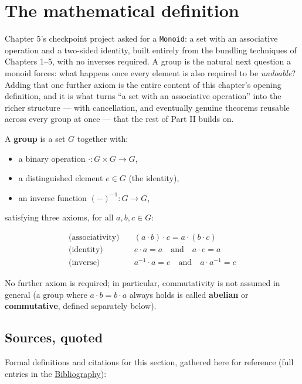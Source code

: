 \section{The mathematical definition}\label{sec:06-groups:01-definition:1}

Chapter 5's checkpoint project asked for a \texttt{Monoid}: a set with an associative operation and a two-sided identity, built entirely from the bundling techniques of Chapters 1--5, with no inverses required. A group is the natural next question a monoid forces: what happens once every element is also required to be \emph{undoable}? Adding that one further axiom is the entire content of this chapter's opening definition, and it is what turns ``a set with an associative operation'' into the richer structure --- with cancellation, and eventually genuine theorems reusable across every group at once --- that the rest of Part II builds on.

A \textbf{group} is a set \(G\) together with:

\begin{itemize}
\tightlist
\item
  a binary operation \(\cdot : G \times G \to G\),
\item
  a distinguished element \(e \in G\) (the identity),
\item
  an inverse function \((-)^{-1} : G \to G\),
\end{itemize}

satisfying three axioms, for all \(a, b, c \in G\):

\[
\begin{aligned}
\text{(associativity)} &\quad (a \cdot b) \cdot c = a \cdot (b \cdot c) \\
\text{(identity)} &\quad e \cdot a = a \quad\text{and}\quad a \cdot e = a \\
\text{(inverse)} &\quad a^{-1} \cdot a = e \quad\text{and}\quad a \cdot a^{-1} = e
\end{aligned}
\]

No further axiom is required; in particular, commutativity is not assumed in general (a group where \(a \cdot b = b \cdot a\) always holds is called \textbf{abelian} or \textbf{commutative}, defined separately below).

\subsection{Sources, quoted}\label{sec:06-groups:01-definition:2}

Formal definitions and citations for this section, gathered here for reference (full entries in the \hyperref[sec:root:bibliography:1]{Bibliography}):

